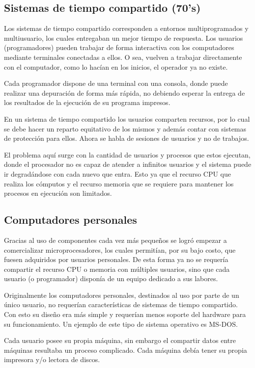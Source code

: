 \subsection{Sistemas de tiempo compartido (70's)}
Los sistemas de tiempo compartido corresponden a entornos multiprogramados y
multiusuario, los cuales entregaban un mejor tiempo de respuesta. Los usuarios
(programadores) pueden trabajar de forma interactiva con los computadores
mediante terminales conectadas a ellos. O sea, vuelven a trabajar directamente
con el computador, como lo hacían en los inicios, el operador ya no existe.

Cada programador dispone de una terminal con una consola, donde puede realizar
una depuración de forma más rápida, no debiendo esperar la entrega de los
resultados de la ejecución de su programa impresos.

En un sistema de tiempo compartido los usuarios comparten recursos, por lo cual
se debe hacer un reparto equitativo de los mismos y además contar con sistemas
de protección para ellos. Ahora se habla de sesiones de usuarios y no de
trabajos.

El problema aquí surge con la cantidad de usuarios y procesos que estos
ejecutan, donde el procesador no es capaz de atender a infinitos usuarios y el
sistema puede ir degradándose con cada nuevo que entra. Esto ya que el recurso
CPU que realiza los cómputos y el recurso memoria que se requiere para mantener
los procesos en ejecución son limitados.

\subsection{Computadores personales}
Gracias al uso de componentes cada vez más pequeños se logró empezar a
comercializar microprocesadores, los cuales permitían, por su bajo costo, que
fuesen adquiridos por usuarios personales. De esta forma ya no se requería
compartir el recurso CPU o memoria con múltiples usuarios, sino que cada usuario
(o programador) disponía de un equipo dedicado a sus labores.

Originalmente los computadores personales, destinados al uso por parte de un
único usuario, no requerían características de sistemas de tiempo compartido.
Con esto su diseño era más simple y requerían menos soporte del hardware para su
funcionamiento. Un ejemplo de este tipo de sistema operativo es MS-DOS.

Cada usuario posee su propia máquina, sin embargo el compartir datos entre
máquinas resultaba un proceso complicado. Cada máquina debía tener su propia
impresora y/o lectora de discos.

